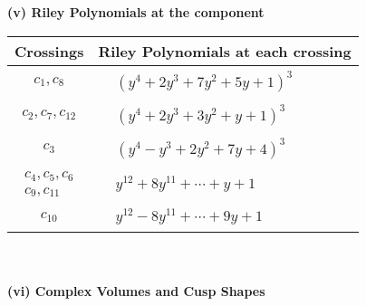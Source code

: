 \documentclass[1p]{elsarticle_modified}
\theoremstyle{definition}
\begin{document}
\newpage\renewcommand{\arraystretch}{1}
\flushleft \textbf{(v) Riley Polynomials at the component}\newline \\
\begin{tabular}{m{50pt}|m{274pt}}
Crossings & \hspace{64pt}Riley Polynomials at each crossing \\
\hline $$\begin{aligned}c_{1},c_{8}\end{aligned}$$&$\begin{aligned}
&(y^4+2 y^3+7 y^2+5 y+1)^3
\end{aligned}$\\
\hline $$\begin{aligned}c_{2},c_{7},c_{12}\end{aligned}$$&$\begin{aligned}
&(y^4+2 y^3+3 y^2+y+1)^3
\end{aligned}$\\
\hline $$\begin{aligned}c_{3}\end{aligned}$$&$\begin{aligned}
&(y^4- y^3+2 y^2+7 y+4)^3
\end{aligned}$\\
\hline $$\begin{aligned}c_{4},c_{5},c_{6}\\c_{9},c_{11}\end{aligned}$$&$\begin{aligned}
&y^{12}+8 y^{11}+\cdots+y+1
\end{aligned}$\\
\hline $$\begin{aligned}c_{10}\end{aligned}$$&$\begin{aligned}
&y^{12}-8 y^{11}+\cdots+9 y+1
\end{aligned}$\\
\hline
\end{tabular}\\~\\
\newpage\flushleft \textbf{(vi) Complex Volumes and Cusp Shapes}
\end{document}
